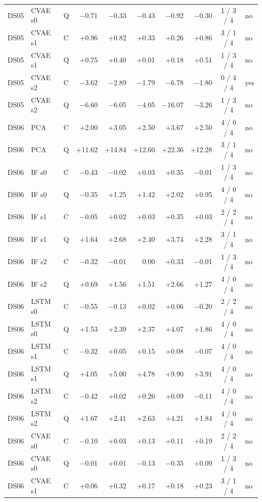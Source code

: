 \documentclass[10pt]{article}
\begin{document}
{\begin{longtable}{lllrrrrrcl}
DS05 & CVAE s0 & Q & −0.71 & −0.33 & −0.43 & −0.92 & −0.30 & 1 / 3 / 4 & no \\
DS05 & CVAE s1 & C & +0.96 & +0.82 & +0.33 & +0.26 & +0.86 & 3 / 1 / 4 & no \\
DS05 & CVAE s1 & Q & +0.75 & +0.40 & +0.01 & +0.18 & +0.51 & 1 / 3 / 4 & no \\
DS05 & CVAE s2 & C & −3.62 & −2.89 & −1.79 & −6.78 & −1.80 & 0 / 4 / 4 & yes \\
DS05 & CVAE s2 & Q & −6.60 & −6.05 & −4.05 & −16.07 & −3.26 & 1 / 3 / 4 & no \\
\midrule
DS06 & PCA & C & +2.00 & +3.05 & +2.50 & +3.67 & +2.50 & 4 / 0 / 4 & no \\
DS06 & PCA & Q & +11.62 & +14.84 & +12.60 & +22.36 & +12.28 & 3 / 1 / 4 & no \\
DS06 & IF s0 & C & −0.43 & −0.02 & +0.03 & +0.35 & −0.01 & 1 / 3 / 4 & no \\
DS06 & IF s0 & Q & −0.35 & +1.25 & +1.42 & +2.02 & +0.95 & 4 / 0 / 4 & no \\
DS06 & IF s1 & C & −0.05 & +0.02 & +0.03 & +0.35 & +0.03 & 2 / 2 / 4 & no \\
DS06 & IF s1 & Q & +1.64 & +2.68 & +2.40 & +3.74 & +2.28 & 3 / 1 / 4 & no \\
DS06 & IF s2 & C & −0.32 & −0.01 & 0.00 & +0.33 & −0.01 & 1 / 3 / 4 & no \\
DS06 & IF s2 & Q & +0.69 & +1.56 & +1.51 & +2.66 & +1.27 & 4 / 0 / 4 & no \\
DS06 & LSTM s0 & C & −0.55 & −0.13 & +0.02 & +0.06 & −0.20 & 2 / 2 / 4 & no \\
DS06 & LSTM s0 & Q & +1.53 & +2.39 & +2.37 & +4.07 & +1.86 & 4 / 0 / 4 & no \\
DS06 & LSTM s1 & C & −0.32 & +0.05 & +0.15 & +0.08 & −0.07 & 4 / 0 / 4 & no \\
DS06 & LSTM s1 & Q & +4.05 & +5.00 & +4.78 & +9.90 & +3.91 & 4 / 0 / 4 & no \\
DS06 & LSTM s2 & C & −0.42 & +0.02 & +0.26 & +0.09 & −0.11 & 4 / 0 / 4 & no \\
DS06 & LSTM s2 & Q & +1.67 & +2.41 & +2.63 & +4.21 & +1.84 & 4 / 0 / 4 & no \\
DS06 & CVAE s0 & C & −0.10 & +0.03 & +0.13 & +0.11 & +0.19 & 2 / 2 / 4 & no \\
DS06 & CVAE s0 & Q & −0.01 & +0.01 & −0.13 & −0.35 & +0.09 & 1 / 3 / 4 & no \\
DS06 & CVAE s1 & C & +0.06 & +0.32 & +0.17 & +0.18 & +0.23 & 3 / 1 / 4 & no \\

\end{longtable}}
\end{document}
